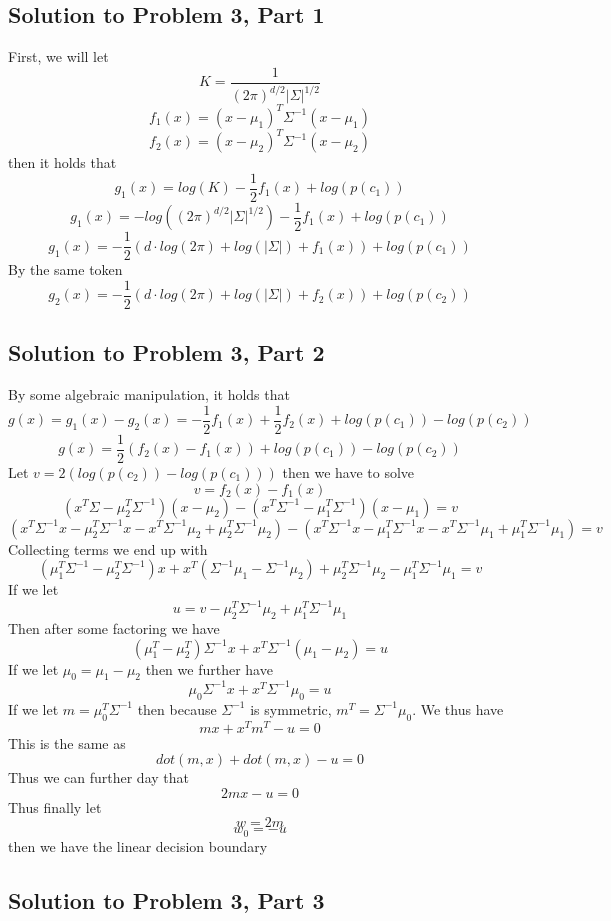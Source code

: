 \documentclass[11pt,psfig]{article}
\begin{document}
\subsection*{Solution to Problem 3, Part 1}
First, we will let
\[
K = \frac{1}{(2\pi)^{d/2}|\Sigma|^{1/2}}
\]
\[
f_1(x) = (x-\mu_1)^T \Sigma^{-1} (x-\mu_1)
\]
\[
f_2(x) = (x-\mu_2)^T \Sigma^{-1} (x-\mu_2)
\]
then it holds that
\[
g_1(x) = log(K) - \frac{1}{2}f_1(x) + log(p(c_1))
\]
\[
g_1(x) = -log((2\pi)^{d/2} |\Sigma|^{1/2}) - \frac{1}{2}f_1(x) + log(p(c_1))
\]
\[
g_1(x) = -\frac{1}{2}( d \cdot log(2\pi) + log(|\Sigma|) + f_1(x)) + log(p(c_1))
\]
By the same token
\[
g_2(x) = -\frac{1}{2}( d \cdot log(2\pi) + log(|\Sigma|) + f_2(x)) + log(p(c_2))
\]

\subsection*{Solution to Problem 3, Part 2}

By some algebraic manipulation, it holds that
\[
g(x) = g_1(x)-g_2(x) = - \frac{1}{2} f_1(x) + \frac{1}{2} f_2(x) + log(p(c_1)) - log(p(c_2))
\]
\[
g(x) = \frac{1}{2} ( f_2(x) - f_1(x) ) + log(p(c_1)) - log(p(c_2))
\]
Let $v = 2( log(p(c_2)) - log(p(c_1)) )$ then we have to solve
\[
v = f_2(x) - f_1(x)
\]
\[
(x^T \Sigma - \mu_2^T \Sigma^{-1})(x - \mu_2) - (x^T \Sigma^{-1} - \mu_1^T \Sigma^{-1})(x - \mu_1) = v
\]
\[
(x^T \Sigma^{-1} x - \mu_2^T \Sigma^{-1} x - x^T \Sigma^{-1} \mu_2 + \mu_2^T \Sigma^{-1} \mu_2) - (x^T \Sigma^{-1} x - \mu_1^T \Sigma^{-1} x - x^T \Sigma^{-1} \mu_1 + \mu_1^T \Sigma^{-1} \mu_1) = v
\]
Collecting terms we end up with
\[
(\mu_1^T \Sigma^{-1} - \mu_2^T \Sigma^{-1}) x + x^T (\Sigma^{-1} \mu_1 - \Sigma^{-1} \mu_2) + \mu_2^T \Sigma^{-1} \mu_2 - \mu_1^T \Sigma^{-1} \mu_1 = v
\]
If we let
\[
u = v - \mu_2^T \Sigma^{-1} \mu_2 + \mu_1^T \Sigma^{-1} \mu_1
\]
Then after some factoring we have
\[
(\mu_1^T - \mu_2^T) \Sigma^{-1} x + x^T \Sigma^{-1} (\mu_1 - \mu_2) = u
\]
If we let $\mu_0 = \mu_1 - \mu_2$ then we further have
\[
\mu_0 \Sigma^{-1} x + x^T \Sigma^{-1} \mu_0 = u
\]
If we let $m = \mu_0^T \Sigma^{-1}$ then because $\Sigma^{-1}$ is symmetric, $m^T = \Sigma^{-1} \mu_0$. We thus have
\[
m x + x^T m^T - u = 0
\]
This is the same as
\[
dot(m,x) + dot(m,x) - u = 0
\]
Thus we can further day that
\[
2mx - u = 0
\]
Thus finally let
\[
w = 2m
\]
\[
w_0 = -u
\]
then we have the linear decision boundary

\subsection*{Solution to Problem 3, Part 3}
\end{document}
